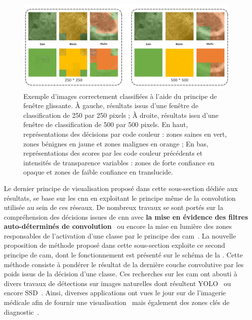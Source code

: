 \begin{figure}[H]
    \centering
    \includegraphics[width=\linewidth]{contents/chapter_6/resources/exemple_image_improvement_well.pdf}
    \caption{Exemple d'images correctement classifiées à l'aide du principe de fenêtre glissante. À gauche, résultats issus d'une fenêtre de classification de 250 par 250 pixels ; À droite, résultats issu d'une fenêtre de classification de 500 par 500 pixels. En haut, représentations des décisions par code couleur : zones saines en vert, zones bénignes en jaune et zones malignes en orange ; En bas, représentations des scores par les code couleur précédents et intensités de transparence variables : zones de forte confiance en opaque et zones de faible confiance en translucide.}
    \label{fig:exemple_image_improvement_well}
\end{figure}\par

Le dernier principe de visualisation proposé dans cette sous-section dédiée aux résultats, se base sur les \gls{cnn} en exploitant le principe même de la convolution utilisée au sein de ces réseaux. De nombreux travaux se sont portés sur la compréhension des décisions issues de \gls{cnn} avec \textbf{la mise en évidence des filtres auto-déterminés de convolution}~\cite{Zeiler2014} ou encore la mise en lumière des zones responsables de l'activation d'une classe par le principe des \acrlong{cam}~\cite{Zhou2015}. La nouvelle proposition de méthode proposé dans cette sous-section exploite ce second principe de \gls{cam}, dont le fonctionnement est présenté sur le schéma de la . Cette méthode consiste à pondérer le résultat de la dernière couche convolutive par les poids issus de la décision d'une classe. Ces recherches sur les \gls{cam} ont abouti à divers travaux de détections sur images naturelles dont résultent YOLO~\cite{Redmon2016} ou encore SSD~\cite{Liu2016}. Ainsi, diverses applications ont vues le jour sur de l'imagerie médicale afin de fournir une visualisation~\cite{jia2017} mais également des zones clés de diagnostic~\cite{Park2019}.\par 
\clearpage

